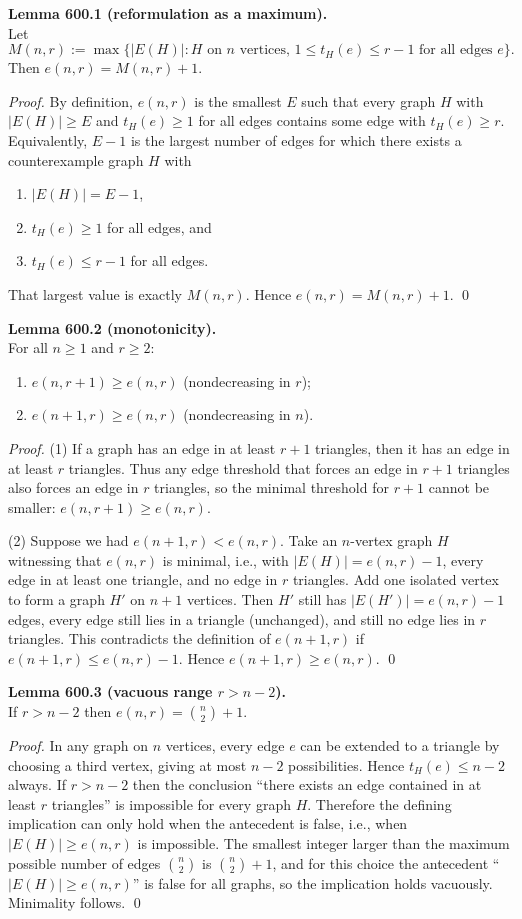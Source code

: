 \medskip
\noindent\textbf{Lemma 600.1 (reformulation as a maximum).}\\
Let
\[
M(n,r):=\max\{|E(H)|: H \text{ on } n \text{ vertices, } 1\le t_H(e)\le r-1 \text{ for all edges }e\}.
\]
Then $e(n,r)=M(n,r)+1$.

\noindent\emph{Proof.}
By definition, $e(n,r)$ is the smallest $E$ such that every graph $H$ with $|E(H)|\ge E$ and $t_H(e)\ge 1$ for all edges contains some edge with $t_H(e)\ge r$.
Equivalently, $E-1$ is the largest number of edges for which there exists a counterexample graph $H$ with
\begin{enumerate}
\item $|E(H)|=E-1$,
\item $t_H(e)\ge 1$ for all edges, and
\item $t_H(e)\le r-1$ for all edges.
\end{enumerate}
That largest value is exactly $M(n,r)$. Hence $e(n,r)=M(n,r)+1$. \qed

\medskip
\noindent\textbf{Lemma 600.2 (monotonicity).}\\
For all $n\ge 1$ and $r\ge 2$:
\begin{enumerate}
\item $e(n,r+1)\ge e(n,r)$ (nondecreasing in $r$);
\item $e(n+1,r)\ge e(n,r)$ (nondecreasing in $n$).
\end{enumerate}

\noindent\emph{Proof.}
(1) If a graph has an edge in at least $r+1$ triangles, then it has an edge in at least $r$ triangles. Thus any edge threshold that forces an edge in $r+1$ triangles also forces an edge in $r$ triangles, so the minimal threshold for $r+1$ cannot be smaller: $e(n,r+1)\ge e(n,r)$.

(2) Suppose we had $e(n+1,r)<e(n,r)$. Take an $n$-vertex graph $H$ witnessing that $e(n,r)$ is minimal, i.e., with $|E(H)|=e(n,r)-1$, every edge in at least one triangle, and no edge in $r$ triangles. Add one isolated vertex to form a graph $H'$ on $n+1$ vertices. Then $H'$ still has $|E(H')|=e(n,r)-1$ edges, every edge still lies in a triangle (unchanged), and still no edge lies in $r$ triangles. This contradicts the definition of $e(n+1,r)$ if $e(n+1,r)\le e(n,r)-1$. Hence $e(n+1,r)\ge e(n,r)$. \qed

\medskip
\noindent\textbf{Lemma 600.3 (vacuous range $r>n-2$).}\\
If $r>n-2$ then $e(n,r)={n\choose 2}+1$.

\noindent\emph{Proof.}
In any graph on $n$ vertices, every edge $e$ can be extended to a triangle by choosing a third vertex, giving at most $n-2$ possibilities. Hence $t_H(e)\le n-2$ always. If $r>n-2$ then the conclusion ``there exists an edge contained in at least $r$ triangles'' is impossible for every graph $H$.
Therefore the defining implication can only hold when the antecedent is false, i.e., when $|E(H)|\ge e(n,r)$ is impossible.
The smallest integer larger than the maximum possible number of edges ${n\choose 2}$ is ${n\choose 2}+1$, and for this choice the antecedent ``$|E(H)|\ge e(n,r)$'' is false for all graphs, so the implication holds vacuously. Minimality follows. \qed

